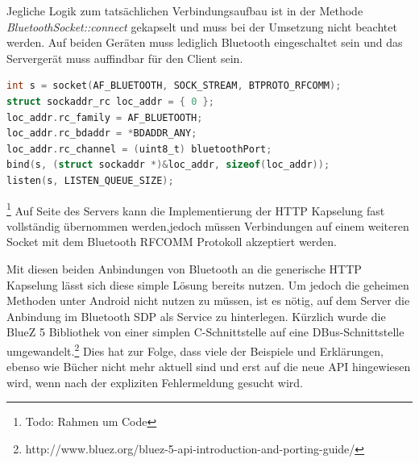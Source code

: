 \documentclass[12pt,a4paper]{article}
\begin{document}
         Jegliche Logik zum tatsächlichen Verbindungsaufbau ist in der Methode {\it BluetoothSocket::connect} gekapselt und muss bei der Umsetzung nicht beachtet werden. Auf beiden Geräten muss lediglich Bluetooth eingeschaltet sein und das Servergerät muss auffindbar für den Client sein.
   
        \begin{lstlisting}[language=C, caption=Verbindungsaufbau mit Bluetooth (Server: C)]
int s = socket(AF_BLUETOOTH, SOCK_STREAM, BTPROTO_RFCOMM);
struct sockaddr_rc loc_addr = { 0 };
loc_addr.rc_family = AF_BLUETOOTH;
loc_addr.rc_bdaddr = *BDADDR_ANY;
loc_addr.rc_channel = (uint8_t) bluetoothPort;
bind(s, (struct sockaddr *)&loc_addr, sizeof(loc_addr));
listen(s, LISTEN_QUEUE_SIZE);
        \end{lstlisting}\footnote{Todo: Rahmen um Code}
        Auf Seite des Servers kann die Implementierung der HTTP Kapselung fast vollständig übernommen werden,jedoch müssen Verbindungen auf einem weiteren Socket mit dem Bluetooth RFCOMM Protokoll akzeptiert werden.
        
        Mit diesen beiden Anbindungen von Bluetooth an die generische HTTP Kapselung lässt sich diese simple Lösung bereits nutzen. Um jedoch die geheimen Methoden unter Android nicht nutzen zu müssen, ist es nötig, auf dem Server die Anbindung im Bluetooth SDP als Service zu hinterlegen. Kürzlich wurde die BlueZ 5 Bibliothek von einer simplen C-Schnittstelle auf eine DBus-Schnittstelle umgewandelt.\footnote{http://www.bluez.org/bluez-5-api-introduction-and-porting-guide/} Dies hat zur Folge, dass viele der Beispiele und Erklärungen, ebenso wie Bücher nicht mehr aktuell sind und erst auf die neue API hingewiesen wird, wenn nach der expliziten Fehlermeldung gesucht wird.
        
\end{document}

